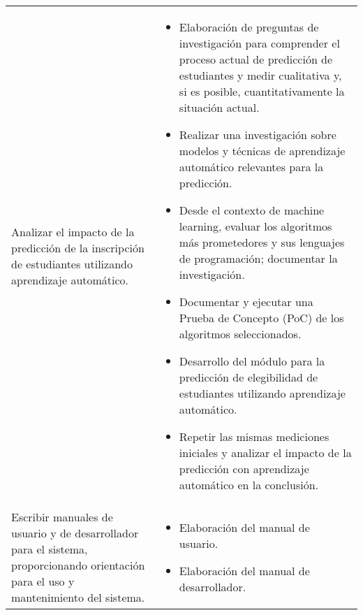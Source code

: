 {\begin{longtable}{>{\raggedright}p{2in}>{\raggedright\arraybackslash}p{4in}}
Analizar el impacto de la predicción de la inscripción de estudiantes utilizando aprendizaje automático. &
\begin{itemize}[nosep,leftmargin=1em,topsep=0pt]
\item Elaboración de preguntas de investigación para comprender el proceso actual de predicción de estudiantes y medir cualitativa y, si es posible, cuantitativamente la situación actual.
\item Realizar una investigación sobre modelos y técnicas de aprendizaje automático relevantes para la predicción.
\item Desde el contexto de machine learning, evaluar los algoritmos más prometedores y sus lenguajes de programación; documentar la investigación.
\item Documentar y ejecutar una Prueba de Concepto (PoC) de los algoritmos seleccionados.
\item Desarrollo del módulo para la predicción de elegibilidad de estudiantes utilizando aprendizaje automático.
\item Repetir las mismas mediciones iniciales y analizar el impacto de la predicción con aprendizaje automático en la conclusión.
\end{itemize} \\

Escribir manuales de usuario y de desarrollador para el sistema, proporcionando orientación para el uso y mantenimiento del sistema. &
\begin{itemize}[nosep,leftmargin=1em,topsep=0pt]
\item Elaboración del manual de usuario.
\item Elaboración del manual de desarrollador.
\end{itemize} \\

\end{longtable}
}
